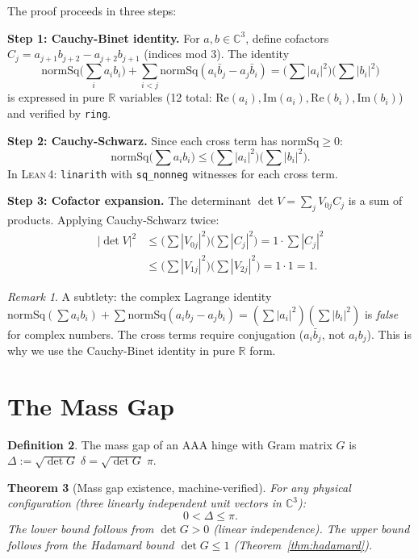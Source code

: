\documentclass[12pt]{article}
\newtheorem{theorem}{Theorem}[section]
\theoremstyle{definition}
\newtheorem{definition}[theorem]{Definition}
\theoremstyle{remark}
\newtheorem{remark}[theorem]{Remark}
\newcommand{\CC}{\mathbb{C}}
\newcommand{\RR}{\mathbb{R}}
\newcommand{\normSq}{\mathrm{normSq}}
\newcommand{\Lean}{\textsc{Lean\,4}}
\begin{document}
The proof proceeds in three steps:

\textbf{Step 1: Cauchy-Binet identity.}
For $a, b \in \CC^3$, define cofactors
$C_j = a_{j+1}b_{j+2} - a_{j+2}b_{j+1}$ (indices mod 3).
The identity
\[
  \normSq\!\bigl(\textstyle\sum_i a_i b_i\bigr)
  + \sum_{i<j} \normSq(a_i \bar b_j - a_j \bar b_i)
  = \bigl(\textstyle\sum |\!a_i\!|^2\bigr)
    \bigl(\textstyle\sum |\!b_i\!|^2\bigr)
\]
is expressed in pure $\RR$ variables (12 total:
$\mathrm{Re}(a_i), \mathrm{Im}(a_i),
 \mathrm{Re}(b_i), \mathrm{Im}(b_i)$)
and verified by \texttt{ring}.

\textbf{Step 2: Cauchy-Schwarz.}
Since each cross term has $\normSq \ge 0$:
\[
  \normSq\!\bigl(\textstyle\sum a_i b_i\bigr)
  \le \bigl(\textstyle\sum |a_i|^2\bigr)
      \bigl(\textstyle\sum |b_i|^2\bigr).
\]
In \Lean{}: \texttt{linarith} with \texttt{sq\_nonneg}
witnesses for each cross term.

\textbf{Step 3: Cofactor expansion.}
The determinant $\det V = \sum_j V_{0j} C_j$ is a
sum of products. Applying Cauchy-Schwarz twice:
\begin{align}
  |\det V|^2
  &\le \bigl(\textstyle\sum |V_{0j}|^2\bigr)
       \bigl(\textstyle\sum |C_j|^2\bigr)
   = 1 \cdot \textstyle\sum |C_j|^2 \\
  &\le \bigl(\textstyle\sum |V_{1j}|^2\bigr)
       \bigl(\textstyle\sum |V_{2j}|^2\bigr)
   = 1 \cdot 1 = 1.
\end{align}

\begin{remark}
A subtlety: the complex Lagrange identity
$\normSq(\sum a_i b_i) + \sum \normSq(a_i b_j - a_j b_i)
 = (\sum|a_i|^2)(\sum|b_i|^2)$ is \emph{false} for
complex numbers. The cross terms require conjugation
($a_i \bar b_j$, not $a_i b_j$). This is why we use
the Cauchy-Binet identity in pure $\RR$ form.
\end{remark}

\section{The Mass Gap}

\begin{definition}
The mass gap of an AAA hinge with Gram matrix $G$ is
$\Delta := \sqrt{\det G}\;\delta = \sqrt{\det G}\;\pi$.
\end{definition}

\begin{theorem}[Mass gap existence, machine-verified]
For any physical configuration (three linearly independent
unit vectors in $\CC^3$):
\[
  0 < \Delta \le \pi.
\]
The lower bound follows from $\det G > 0$
(linear independence). The upper bound follows from
the Hadamard bound $\det G \le 1$
(Theorem~\ref{thm:hadamard}).
\end{theorem}
\end{document}
